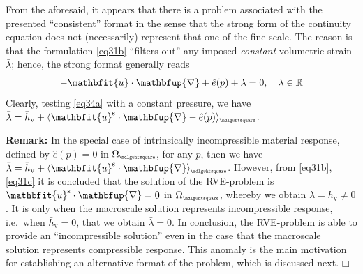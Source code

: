 \documentclass[12pt,a4paper]{article}
\renewcommand{\ta}[1]{\mathbfit{#1}}
\renewcommand{\diff}{\mathbfup{\nabla}}
\renewcommand{\Box}{\mdlgwhtsquare}
\DeclarePairedDelimiter{\homgen}{\langle}{\rangle_\rve}
\renewcommand{\vol}{\mathrm{v}}
\newcommand{\rve}{
  {\mathchoice
   {\mbox{\scalebox{0.67}{$\Box$}}}
   {\mbox{\scalebox{0.67}{$\Box$}}}
   {\mbox{\scalebox{0.5}{$\Box$}}}
   {\mbox{\scalebox{0.375}{$\Box$}}}
  }
}
\begin{document}
From the aforesaid, it appears that there is a problem associated with the presented ``consistent'' format in the sense that the strong form of the continuity equation does not (necessarily) represent that one of the fine scale.
The reason is that the formulation \cref{eq31b} ``filters out'' any imposed \emph{constant} volumetric strain $\bar{\lambda}$; hence, the strong format generally reads
\begin{equation}
    - \ta{u}\cdot\diff + \hat{e}(p) + \bar{\lambda} = 0, \quad \bar{\lambda}\in\set{R}
\label{eq34a}
\end{equation}
Clearly, testing \cref{eq34a} with a constant pressure, we have $\bar{\lambda}=\bar{h}_\vol+\homgen{\ta{u}^\fluct\cdot\diff-\hat{e}(p)}$.

\textbf{Remark:} In the special case of intrinsically incompressible material response, defined by $\hat{e}(p)=0$ in $\Omega_\rve$, for any $p$, then we have  $\bar{\lambda}=\bar{h}_\vol+\homgen{\ta{u}^\fluct\cdot\diff}$.
However, from \cref{eq31b}, \cref{eq31c} it is concluded that the solution of the RVE-problem is $\ta{u}^\fluct\cdot\diff=0$ in $\Omega_\rve$, whereby we obtain $\bar{\lambda}=\bar{h}_\vol \neq 0$.
It is only when the macroscale solution represents incompressible response, i.e.\ when $\bar{h}_\vol = 0$, that we obtain $\bar{\lambda} = 0$.
In conclusion, the RVE-problem is able to provide an ``incompressible solution'' even in the case that the macroscale solution represents compressible response.
This anomaly is the main motivation for establishing an alternative format of the problem, which is discussed next. $\Box$
\end{document}
